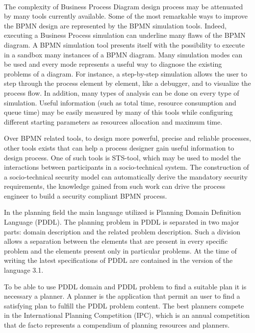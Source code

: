 \paragraph{}
The complexity of Business Process Diagram design process may be attenuated by many tools currently available. 
Some of the most remarkable ways to improve the BPMN design are represented by the BPMN simulation tools. Indeed, executing a Business Process simulation can underline many flaws of the BPMN diagram. 
A BPMN simulation tool presents itself with the possibility to execute in a sandbox many instances of a BPMN diagram. Many simulation modes can be used and every mode represents a useful way to diagnose the existing problems of a diagram. 
For instance, a step-by-step simulation allows the user to step through the process element by element, like a debugger, and to visualize the process flow. In addition, many types of analysis can be done on every type of simulation. 
Useful information (such as total time, resource consumption and queue time) may be easily measured by many of this tools while configuring different starting parameters as resources allocation and maximum time. 

Over BPMN related tools, to design more powerful, precise and reliable processes, other tools exists that can help a process designer gain useful information to design process. One of such tools is STS-tool, which may be used to model the interactions between participants in a socio-technical system. The construction of a socio-technical security model can automatically derive the mandatory security requirements, the knowledge gained from such work can drive the process engineer to build a security compliant BPMN process.


In the planning field the main language utilized is Planning Domain Definition Language (PDDL). The planning problem in PDDL is separated in two major parts: domain description and the related problem description. Such a division allows a separation between the elements that are present in every specific problem and the elements present only in particular problems. At the time of writing the latest specifications of PDDL are contained in the version of the language 3.1.

To be able to use PDDL domain and PDDL problem to find a suitable plan it is necessary a planner. A planner is the application that permit an user to find a satisfying plan to fulfill the PDDL problem content.
The best planners compete in the International Planning Competition (IPC), which is an annual competition that de facto represents a compendium of planning resources and planners. 

